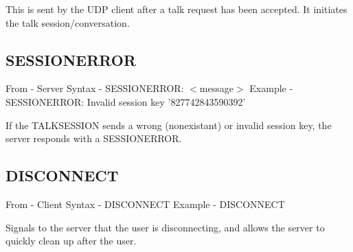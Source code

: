 \documentclass[12pt]{rapport}
\begin{document}
\noindent This is sent by the UDP client after a talk request has been
accepted. It initiates the talk session/conversation.

\subsection*{SESSIONERROR}
From    - Server\newline
Syntax  - SESSIONERROR: $<$message$>$\newline
Example - SESSIONERROR: Invalid session key '827742843590392'\newline

\noindent If the TALKSESSION sends a wrong (nonexistant) or invalid
session key, the server responds with a SESSIONERROR.

\subsection*{DISCONNECT}
From    - Client\newline
Syntax  - DISCONNECT\newline
Example - DISCONNECT\newline

\noindent Signals to the server that the user is disconnecting, and
allows the server to quickly clean up after the user.
\end{document}
